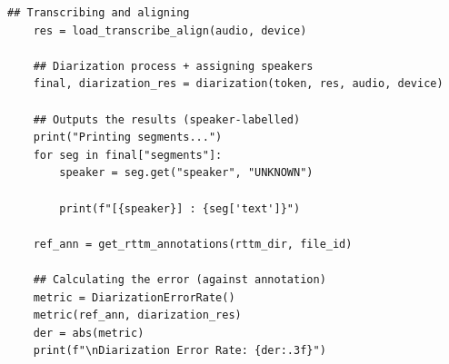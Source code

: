 \documentclass{article}
\begin{document}
\begin{lstlisting}[style=pythonstyle, caption={Simple Diarization (No LLM)}]
    ## Transcribing and aligning
    res = load_transcribe_align(audio, device)

    ## Diarization process + assigning speakers
    final, diarization_res = diarization(token, res, audio, device)

    ## Outputs the results (speaker-labelled)
    print("Printing segments...")
    for seg in final["segments"]:
        speaker = seg.get("speaker", "UNKNOWN")

        print(f"[{speaker}] : {seg['text']}")

    ref_ann = get_rttm_annotations(rttm_dir, file_id)

    ## Calculating the error (against annotation)
    metric = DiarizationErrorRate()
    metric(ref_ann, diarization_res)
    der = abs(metric)
    print(f"\nDiarization Error Rate: {der:.3f}")
\end{lstlisting}
\end{document}
